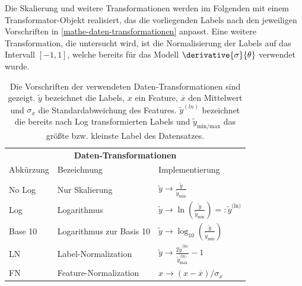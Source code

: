 Die Skalierung und weitere Transformationen werden im Folgenden mit einem Transformator-Objekt realisiert, das die vorliegenden Labels nach den jeweiligen Vorschriften in \textsf{\autoref{mathe-daten-transformationen}} anpasst. Eine weitere Transformation, die untersucht wird, ist die Normalisierung der Labels auf das Intervall $[-1, 1]$, welche bereits für das Modell $\derivative{\sigma}{\theta}$ verwendet wurde.
\begin{table}
	\centering
	\captionsetup{justification=justified}
	\caption{Die Vorschriften der verwendeten Daten-Transformationen sind gezeigt. $\tilde{y}$ bezeichnet die Labels, $x$ ein Feature, $\overline{x}$ den Mittelwert und $\sigma_x$ die Standardabweichung des Features. $\tilde{y}^{(ln)}$ bezeichnet die bereits nach Log transformierten Labels und $\tilde{y}_{\text{min/max}}$ das größte bzw. kleinste Label des Datensatzes.}
	\begin{tabular}{lll}
		\multicolumn{3}{c}{\textbf{Daten-Transformationen}} \\[5pt]
		Abkürzung & Bezeichnung & Implementierung \\
		\hline\\[-10pt]
		No Log & Nur Skalierung & $\tilde{y} \rightarrow \frac{\tilde{y}}{\tilde{y}_{\text{min}}}$ \\
		Log & Logarithmus & $\tilde{y} \rightarrow \ln(\frac{\tilde{y}}{\tilde{y}_{\text{min}}}) =: \tilde{y}^{\text{(ln)}}$ \\
		Base 10 & Logarithmus zur Basis 10 & $\tilde{y} \rightarrow \log_{10}(\frac{\tilde{y}}{\tilde{y}_{\text{min}}})$ \\
		LN & Label-Normalization & $\tilde{y} \rightarrow \frac{2\tilde{y}^{\text{(ln)}}}{\tilde{y}^{\text{(ln)}}_{\text{max}}} - 1$\\
		FN \cite{FN} & Feature-Normalization & $x \rightarrow {(x - \overline{x})}/{\sigma_x}$ \\
		\hline
	\end{tabular}
	\label{mathe-daten-transformationen}
\end{table}

